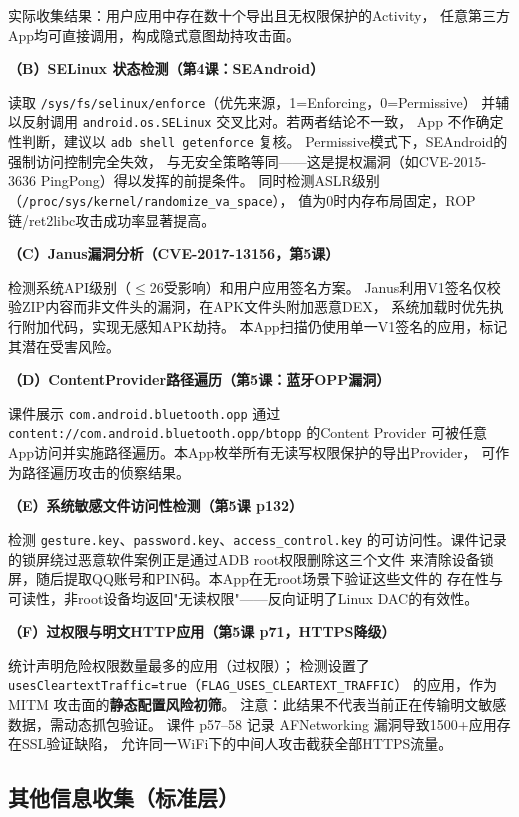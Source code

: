 \documentclass[10pt,a4paper]{article}
\begin{document}
\noindent 实际收集结果：用户应用中存在数十个导出且无权限保护的Activity，
任意第三方App均可直接调用，构成隐式意图劫持攻击面。

\textbf{（B）SELinux 状态检测（第4课：SEAndroid）}

\noindent 读取 \texttt{/sys/fs/selinux/enforce}（优先来源，1=Enforcing，0=Permissive）
并辅以反射调用 \texttt{android.os.SELinux} 交叉比对。若两者结论不一致，
App 不作确定性判断，建议以 \texttt{adb shell getenforce} 复核。
Permissive模式下，SEAndroid的强制访问控制完全失效，
与无安全策略等同——这是提权漏洞（如CVE-2015-3636 PingPong）得以发挥的前提条件。
同时检测ASLR级别（\texttt{/proc/sys/kernel/randomize\_va\_space}），
值为0时内存布局固定，ROP链/ret2libc攻击成功率显著提高。

\textbf{（C）Janus漏洞分析（CVE-2017-13156，第5课）}

\noindent 检测系统API级别（$\leq$26受影响）和用户应用签名方案。
Janus利用V1签名仅校验ZIP内容而非文件头的漏洞，在APK文件头附加恶意DEX，
系统加载时优先执行附加代码，实现无感知APK劫持。
本App扫描仍使用单一V1签名的应用，标记其潜在受害风险。

\textbf{（D）ContentProvider路径遍历（第5课：蓝牙OPP漏洞）}

\noindent 课件展示 \texttt{com.android.bluetooth.opp} 通过
\texttt{content://com.android.bluetooth.opp/btopp} 的Content Provider
可被任意App访问并实施路径遍历。本App枚举所有无读写权限保护的导出Provider，
可作为路径遍历攻击的侦察结果。

\textbf{（E）系统敏感文件访问性检测（第5课 p132）}

\noindent 检测 \texttt{gesture.key}、\texttt{password.key}、\texttt{access\_control.key}
的可访问性。课件记录的锁屏绕过恶意软件案例正是通过ADB root权限删除这三个文件
来清除设备锁屏，随后提取QQ账号和PIN码。本App在无root场景下验证这些文件的
存在性与可读性，非root设备均返回"无读权限"——反向证明了Linux DAC的有效性。

\textbf{（F）过权限与明文HTTP应用（第5课 p71，HTTPS降级）}

\noindent 统计声明危险权限数量最多的应用（过权限）；
检测设置了 \texttt{usesCleartextTraffic=true}（\texttt{FLAG\_USES\_CLEARTEXT\_TRAFFIC}）
的应用，作为 MITM 攻击面的\textbf{静态配置风险初筛}。
注意：此结果不代表当前正在传输明文敏感数据，需动态抓包验证。
课件 p57--58 记录 AFNetworking 漏洞导致1500+应用存在SSL验证缺陷，
允许同一WiFi下的中间人攻击截获全部HTTPS流量。

\subsection{其他信息收集（标准层）}
\end{document}
